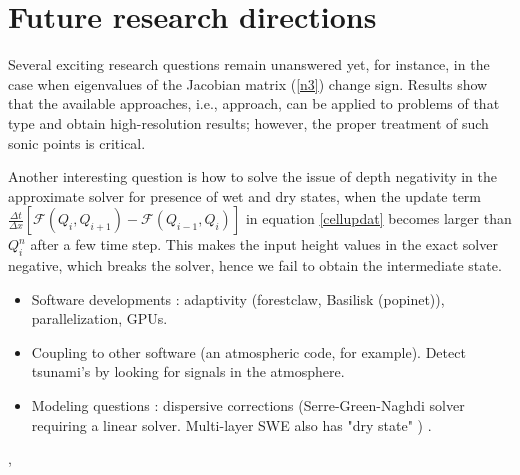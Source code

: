 \documentclass[11pt,a4paper]{article}
\begin{document}
	\section{ Future research directions}
	Several exciting research questions remain unanswered yet, for instance, in the case when eigenvalues of the Jacobian matrix (\eqref{n3}) change sign. Results show that the available approaches, i.e.,  \citet{ba-le-mi-ro:2003} approach, can be applied to problems of that type and obtain high-resolution results; however, the proper treatment of such sonic points is critical. 
	
	Another interesting question is  how to solve the issue of depth negativity in the approximate solver for presence of wet and dry states, when the update term $  \frac{\Delta t}{\Delta x} \left[ \mathcal{F}(Q_{i} , Q_{i+1} ) - \mathcal{F}(Q_{i-1} , Q_{i} ) \right]$ in equation \eqref{cellupdat} becomes larger than $Q_{i}^{n}$  after a few time step. This makes the input height values in the exact solver negative, which breaks the solver, hence we fail to obtain the intermediate state. 

	\begin{itemize}
	\item Software developments : adaptivity (forestclaw, Basilisk (popinet)), parallelization, GPUs. \cite{qi-le-mo:2018,po:2015,be-ge-le-ma:2011}   
	\item Coupling to other software (an atmospheric code, for example).  Detect tsunami's by looking for signals in the atmosphere.
	\item Modeling questions : dispersive corrections (Serre-Green-Naghdi solver  requiring a linear solver.  Multi-layer SWE also has "dry state" ) \cite{la-bo:2009,po:2020,po:2015}.
	\end{itemize}
	
	
	
	
	
	,
	
	
	
\end{document}
